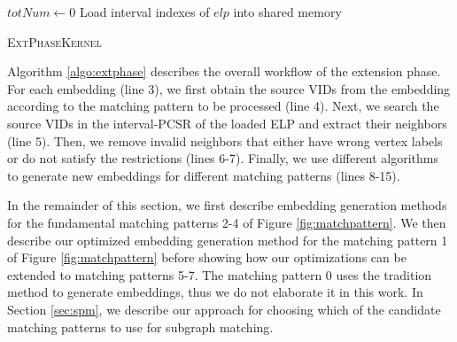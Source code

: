 \begin{algorithm}[t]
$totNum \leftarrow 0$\;
Load interval indexes of $elp$ into shared memory\;

\caption{\textsc{ExtPhaseKernel}} \label{algo:extphase}
\end{algorithm}



Algorithm \ref{algo:extphase} describes the overall workflow of the \SystemName extension phase. For each embedding (line 3), we first
obtain the source VIDs from the embedding according to the matching pattern to be processed (line 4). Next, we search the source VIDs in
the \SystemName interval-PCSR of the loaded ELP and extract their neighbors (line 5).  Then, we remove invalid neighbors that either have
wrong vertex labels or do not satisfy the restrictions (lines 6-7). Finally, we use different algorithms to generate new embeddings for
different matching patterns (lines 8-15).

In the remainder of this section, we first describe embedding generation methods for the fundamental matching patterns 2-4 of Figure
\ref{fig:matchpattern}. We then describe our optimized embedding generation method for the matching pattern 1 of Figure
\ref{fig:matchpattern} before showing how our optimizations can be extended to matching patterns 5-7. The matching pattern 0 uses the
tradition method to generate embeddings, thus we do not elaborate it in this work. In Section \ref{sec:spm}, we describe our approach for
choosing which of the candidate matching patterns to use for subgraph matching.

